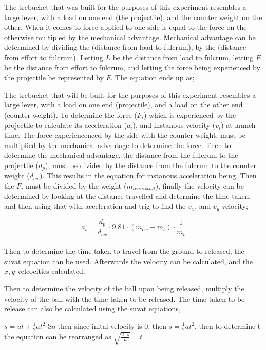 \documentclass[12pt]{article}
\begin{document}

The trebuchet that was built for the purposes of this experiment resembles a large lever, with a load on one end (the projectile), and the counter weight on the other. When it comes to force applied to one side is equal to the force on the otherwise multipled by the mechanical advantage. Mechanical advantage can be determined by dividing the (distance from load to fulcrum), by the (distance from effort to fulcrum). Letting \(L\) be the distance from load to fulcrum, letting \(E\) be the distance from effort to fulcrum, and letting the force being experienced by the projectile be represented by \(F\). The equation ends up as;

The trebuchet that will be built for the purposes of this experiment resembles a large lever, with a load on one end (projectile), and a load on the other end (counter-weight). To determine the force (\(F_{i}\)) which is experienced by the projectile to calculate its acceleration (\(a_{i}\)), and instanous-velocity (\(v_{i}\)) at launch time. The force experiencenced by the side with the counter weight, must be multiplied by the mechanical advantage to determine the force. Then to determine the mechanical advantage, the distance from the fulcrum to the projectile (\(d_{p}\)), must be divided by the distance from the fulcrum to the counter weight (\(d_{cw}\)). This results in the equation for instanous acceleration being. Then the \(F_{i}\) must be divided by the weight (\(m_{tennis ball}\)), finally the velocity can be determined by looking at the distance travelled and determine the time taken, and then using that with acceleration and trig to find the \(v_{x}\), and \(v_{y}\) velocity;

\[ a_{t} = \frac{d_{p}}{d_{cw}}\cdot9.81\cdot ( m_{cw} - m_{t} ) \cdot \frac{1}{m_{t}}\] \\
Then to determine the time taken to travel from the ground to released, the suvat equation can be used. Afterwards the velocity can be calculated, and the \(x, y\) velcocities calculated.

Then to determine the velocity of the ball upon being released, multiply the velocity of the ball with the time taken to be released. The time taken to be release can also be calculated using the suvat equations,

\(s = ut + \frac{1}{2}at^{2}\) So then since inital velocity is 0, then \(s = \frac{1}{2}at^{2}\), then to determine t the equation can be rearranged as \(\sqrt{\frac{2 \cdot s }{a}} = t\)
\end{document}
